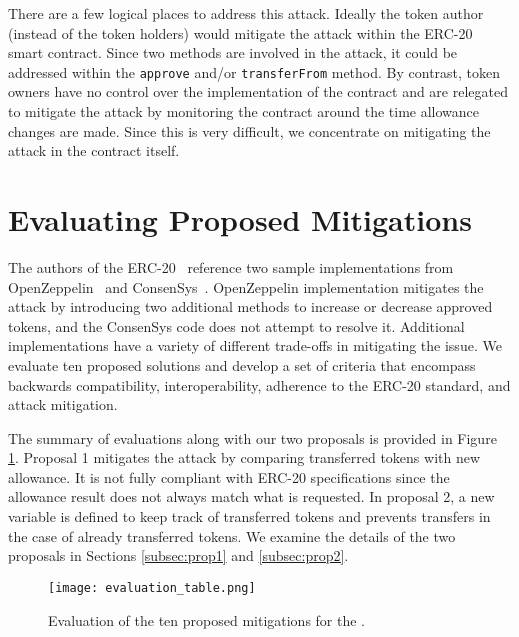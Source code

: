 There are a few logical places to address this attack. Ideally the token author (instead of the token holders) would mitigate the attack within the ERC-20 smart contract. Since two methods are involved in the attack, it could be addressed within the \texttt{approve} and/or \texttt{transferFrom} method. By contrast, token owners have no control over the implementation of the contract and are relegated to mitigate the attack by monitoring the contract around the time allowance changes are made. Since this is very difficult, we concentrate on mitigating the attack in the contract itself.

\section{Evaluating Proposed Mitigations}
The authors of the ERC-20~\cite{Interface} reference two sample implementations from OpenZeppelin~\cite{OpenZeppelin_Token} and ConsenSys~\cite{ConsenSys_Token}. OpenZeppelin implementation mitigates the attack by introducing two additional methods to increase or decrease approved tokens, and the ConsenSys code does not attempt to resolve it. Additional implementations have a variety of different trade-offs in mitigating the issue. We evaluate ten proposed solutions and develop a set of criteria that encompass backwards compatibility, interoperability, adherence to the ERC-20 standard, and attack mitigation. 

The summary of evaluations along with our two proposals is provided in Figure \ref{fig:mitigations}. Proposal 1 mitigates the attack by comparing transferred tokens with new allowance. It is not fully compliant with ERC-20 specifications since the allowance result does not always match what is requested. In proposal 2, a new variable is defined to keep track of transferred tokens and prevents transfers in the case of already transferred tokens. We examine the details of the two proposals in Sections \ref{subsec:prop1} and \ref{subsec:prop2}.

\begin{figure}[t]
	\centering
	\texttt{[image: evaluation\_table.png]}
	\caption[Evaluation of ten \mwa mitigation proposals]{Evaluation of the ten proposed mitigations for the \mwa.}
	\label{fig:mitigations}
\end{figure}

